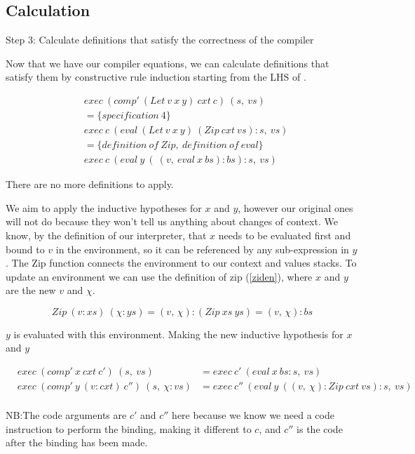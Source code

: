 \documentclass {article}
\begin{document}
\subsection{Calculation}

Step 3: Calculate definitions that satisfy
	the correctness of the compiler

Now that we have our compiler equations,
we can calculate definitions that satisfy
them by constructive rule induction
starting from the LHS of \cite[page 42]{bandh}.

\begin{align*}
	&exec\ (comp'\ (Let\ v\ x\ y)\ cxt\ c)\ (s,\ vs) \\
	&= \{ specification\ 4 \} \\
	&exec\ c\ (eval\ (Let\ v\ x\ y)\ (Zip\ cxt\ vs):s,\ vs) \\
	&= \{definition\ of\ Zip,\ definition\ of\ eval\} \\
	&exec\ c\ (eval\ y\ (\ (v,\ eval\ x\ bs) :bs) : s,\ vs)
\end{align*}

There are no more definitions to apply.

We aim to apply the inductive 
hypotheses for $x$ and $y$,
however our original ones will 
not do because they won't tell us
anything about changes of context.
We know, by the definition of our interpreter,
that $x$ needs to be evaluated first and 
bound to $v$ in the environment, so it can be 
referenced by any sub-expression
in $y$.
The Zip function connects the environment
to our context and values stacks.
To update an environment
we can use the definition of zip (\ref{ziden}),
where $x$ and $y$ are the new $v$ and $\chi$.

\[ Zip\ (v:xs)\ (\chi:ys) = (v,\, \chi):(Zip\ xs\ ys) = (v,\, \chi):bs \]

$y$ is evaluated with this environment.
Making the new inductive hypothesis for $x$ and $y$

\begin{eqnarray*}
	&exec\ (comp'\ x\ cxt\ c')\ (s,\ vs)
		&= exec\ c'\ (eval\ x\ bs : s,\ vs)\\
	&exec\ (comp'\ y\ (v:cxt)\ c'')\ (s,\ \chi : vs) 
		&= exec\ c''\ (eval\ y\ 
					(
					(v,\ \chi) : Zip\ cxt\ vs) : s,\ vs
					)\\
\end{eqnarray*}

NB:The code arguments are $c'$ and $c''$ 
here because we know we need a code instruction
to perform the binding, making it different to $c$,
and $c''$ is the code after the binding has been made.
\end{document}
